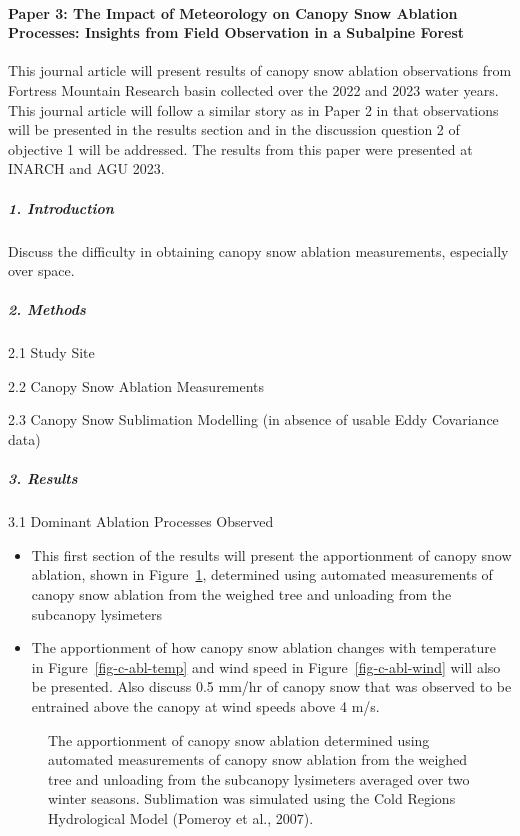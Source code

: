 \documentclass[
  letterpaper,
  DIV=11,
  numbers=noendperiod]{scrartcl}
\let\oldparagraph\paragraph
\renewcommand{\paragraph}[1]{\oldparagraph{#1}\mbox{}}
\let\oldsubparagraph\subparagraph
\renewcommand{\subparagraph}[1]{\oldsubparagraph{#1}\mbox{}}
\begin{document}
\paragraph{Paper 3: The Impact of Meteorology on Canopy Snow Ablation
Processes: Insights from Field Observation in a Subalpine
Forest}\label{paper-3-the-impact-of-meteorology-on-canopy-snow-ablation-processes-insights-from-field-observation-in-a-subalpine-forest}

This journal article will present results of canopy snow ablation
observations from Fortress Mountain Research basin collected over the
2022 and 2023 water years. This journal article will follow a similar
story as in Paper 2 in that observations will be presented in the
results section and in the discussion question 2 of objective 1 will be
addressed. The results from this paper were presented at INARCH and AGU
2023.

\subparagraph{1. Introduction}\label{introduction-3}

Discuss the difficulty in obtaining canopy snow ablation measurements,
especially over space.

\subparagraph{2. Methods}\label{methods-1}

2.1 Study Site

2.2 Canopy Snow Ablation Measurements

2.3 Canopy Snow Sublimation Modelling (in absence of usable Eddy
Covariance data)

\subparagraph{3. Results}\label{results-1}

3.1 Dominant Ablation Processes Observed

\begin{itemize}
\item
  This first section of the results will present the apportionment of
  canopy snow ablation, shown in Figure~\ref{fig-c-abl}, determined
  using automated measurements of canopy snow ablation from the weighed
  tree and unloading from the subcanopy lysimeters
\item
  The apportionment of how canopy snow ablation changes with temperature
  in Figure~\ref{fig-c-abl-temp} and wind speed in
  Figure~\ref{fig-c-abl-wind} will also be presented. Also discuss 0.5
  mm/hr of canopy snow that was observed to be entrained above the
  canopy at wind speeds above 4 m/s.
\end{itemize}

\begin{figure}


\caption{\label{fig-c-abl}The apportionment of canopy snow ablation
determined using automated measurements of canopy snow ablation from the
weighed tree and unloading from the subcanopy lysimeters averaged over
two winter seasons. Sublimation was simulated using the Cold Regions
Hydrological Model (Pomeroy et al., 2007).}

\end{figure}%
\end{document}
